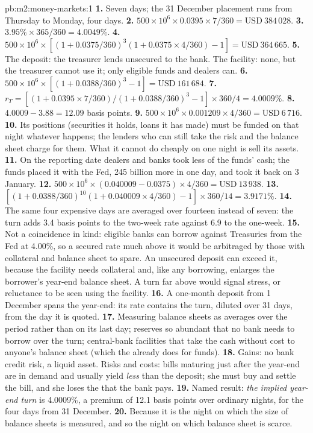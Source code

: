 \begin{solution}{pb:m2:money-markets:1}
\textbf{1.} Seven days; the 31 December placement runs from Thursday to Monday,
four days.
\textbf{2.} $500 \times 10^6 \times 0.0395 \times 7/360 = \text{USD}~384\,028$.
\textbf{3.} $3.95\% \times 365/360 = 4.0049\%$.
\textbf{4.} $500 \times 10^6 \times [(1 + 0.0375/360)^3(1 + 0.0375 \times 4/360) -
1] = \text{USD}~364\,665$.
\textbf{5.} The deposit: the treasurer lends unsecured to the bank. The
facility: none, but the treasurer cannot use it; only eligible funds and
dealers can.
\textbf{6.} $500 \times 10^6 \times [(1 + 0.0388/360)^3 - 1] = \text{USD}~161\,684$.
\textbf{7.} $r_T = [(1 + 0.0395 \times 7/360)/(1 + 0.0388/360)^3 - 1] \times
360/4 = 4.0009\%$.
\textbf{8.} $4.0009 - 3.88 = 12.09$ basis points.
\textbf{9.} $500 \times 10^6 \times 0.001209 \times 4/360 = \text{USD}~6\,716$.
\textbf{10.} Its positions (securities it holds, loans it has made) must be
funded on that night whatever happens; the lenders who can still take the
risk and the balance sheet charge for them. What it cannot do cheaply on
one night is sell its assets.
\textbf{11.} On the reporting date dealers and banks took less of the funds'
cash; the funds placed it with the Fed, 245 billion more in one day, and took
it back on 3 January.
\textbf{12.} $500 \times 10^6 \times (0.040009 - 0.0375) \times 4/360 =
\text{USD}~13\,938$.
\textbf{13.} $[(1 + 0.0388/360)^{10}(1 + 0.040009 \times 4/360) - 1] \times
360/14 = 3.9171\%$.
\textbf{14.} The same four expensive days are averaged over fourteen instead of
seven: the turn adds 3.4 basis points to the two-week rate against 6.9 to the
one-week.
\textbf{15.} Not a coincidence in kind: eligible banks can borrow against
Treasuries from the Fed at 4.00\%, so a secured rate much above it would
be arbitraged by those with collateral and balance sheet to spare. An
unsecured deposit can exceed it, because the facility needs collateral and,
like any borrowing, enlarges the borrower's year-end balance sheet. A turn
far above would signal stress, or reluctance to be seen using the facility.
\textbf{16.} A one-month deposit from 1 December spans the year-end: its
rate contains the turn, diluted over 31 days, from the day it is quoted.
\textbf{17.} Measuring balance sheets as averages over the period rather than
on its last day; reserves so abundant that no bank needs to borrow over the
turn; central-bank facilities that take the cash without cost to anyone's
balance sheet (which the  already does for funds).
\textbf{18.} Gains: no bank credit risk, a liquid asset. Risks and costs:
bills maturing just after the year-end are in demand and usually yield
\emph{less} than the deposit; she must buy and settle the bill, and she
loses the  that the bank pays.
\textbf{19.} Named result: \emph{the implied year-end turn} is 4.0009\%, a
premium of 12.1 basis points over ordinary nights, for the four days from 31
December.
\textbf{20.} Because it is the night on which the size of balance sheets is
measured, and so the night on which balance sheet is scarce.
\end{solution}


